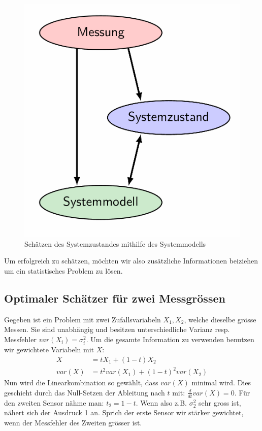 \documentclass[../Main.tex]{subfiles}
\begin{document}
\begin{figure}[H]
    \centering
    \includegraphics[width=0.35\linewidth]{Images/schaetzen.png}
    \caption{Schätzen des Systemzustandes mithilfe des Systemmodells}
\end{figure}
Um erfolgreich zu schätzen, möchten wir also
zusätzliche Informationen beiziehen um ein
statistisches Problem zu lösen.

\subsection{Optimaler Schätzer für zwei Messgrössen}
Gegeben ist ein Problem mit zwei Zufallsvariabeln
\(X_1,X_2\), welche dieselbe grösse Messen.
Sie sind unabhängig und besitzen unterschiedliche
Varianz resp. Messfehler \(var(X_i)=\sigma_i^2\).
Um die gesamte Information zu verwenden benutzen
wir gewichtete Variabeln mit \(X\):
\begin{equation}
    \begin{split}
        X &= tX_1+(1-t)X_2 \\
        var(X) &= t^2var(X_1) + (1-t)^2var(X_2)
    \end{split}
\end{equation}
Nun wird die Linearkombination so gewählt,
dass \(var(X)\) minimal wird.
Dies geschieht durch das Null-Setzen der Ableitung nach \(t\) mit: \(\frac{d}{dt}var(X)=0\).
Für den zweiten Sensor nähme man: \(t_2 = 1-t\).
Wenn also z.B. \(\sigma_2^2\) sehr gross ist, nähert
sich der Ausdruck 1 an. Sprich der erste Sensor
wir stärker gewichtet, wenn der Messfehler des Zweiten grösser ist.
\end{document}
